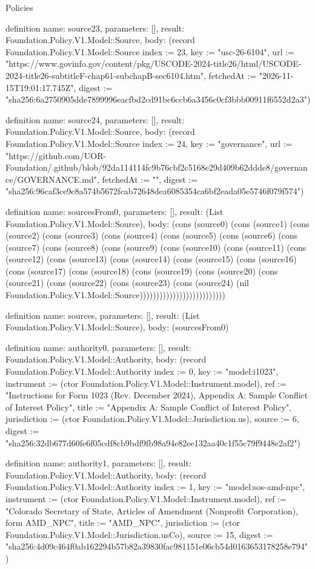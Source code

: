 \begin{lexlean}{Policies}
\begin{semanticmodule}
definition{
  name: source23,
  parameters: [],
  result: Foundation.Policy.V1.Model::Source,
  body: (record Foundation.Policy.V1.Model::Source {index := 23, key := "usc-26-6104", url := "https://www.govinfo.gov/content/pkg/USCODE-2024-title26/html/USCODE-2024-title26-subtitleF-chap61-subchapB-sec6104.htm", fetchedAt := "2026-11-15T19:01:17.745Z", digest := "sha256:6a2750905dde7899996eacfbd2cd91bc6ccb6a3456c0cf3bbb00911f6552d2a3"})
}

definition{
  name: source24,
  parameters: [],
  result: Foundation.Policy.V1.Model::Source,
  body: (record Foundation.Policy.V1.Model::Source {index := 24, key := "governance", url := "https://github.com/UOR-Foundation/.github/blob/92da114114fc9b76cbf2c5168e29d409b62ddde8/governance/GOVERNANCE.md", fetchedAt := "", digest := "sha256:96caf3ce9c8a574b5672fcab72648dea6085354ca6bf2eada05e5746f079f574"})
}

definition{
  name: sourcesFrom0,
  parameters: [],
  result: (List Foundation.Policy.V1.Model::Source),
  body: (cons (source0) (cons (source1) (cons (source2) (cons (source3) (cons (source4) (cons (source5) (cons (source6) (cons (source7) (cons (source8) (cons (source9) (cons (source10) (cons (source11) (cons (source12) (cons (source13) (cons (source14) (cons (source15) (cons (source16) (cons (source17) (cons (source18) (cons (source19) (cons (source20) (cons (source21) (cons (source22) (cons (source23) (cons (source24) (nil Foundation.Policy.V1.Model::Source))))))))))))))))))))))))))
}

definition{
  name: sources,
  parameters: [],
  result: (List Foundation.Policy.V1.Model::Source),
  body: (sourcesFrom0)
}

definition{
  name: authority0,
  parameters: [],
  result: Foundation.Policy.V1.Model::Authority,
  body: (record Foundation.Policy.V1.Model::Authority {index := 0, key := "model:i1023", instrument := (ctor Foundation.Policy.V1.Model::Instrument.model), ref := "Instructions for Form 1023 (Rev. December 2024), Appendix A: Sample Conflict of Interest Policy", title := "Appendix A: Sample Conflict of Interest Policy", jurisdiction := (ctor Foundation.Policy.V1.Model::Jurisdiction.us), source := 6, digest := "sha256:32db677d60fe6f05cdf8cb9bdf9fb98a94e82ee132aa40c1f55c79f9448e2af2"})
}

definition{
  name: authority1,
  parameters: [],
  result: Foundation.Policy.V1.Model::Authority,
  body: (record Foundation.Policy.V1.Model::Authority {index := 1, key := "model:sos-amd-npc", instrument := (ctor Foundation.Policy.V1.Model::Instrument.model), ref := "Colorado Secretary of State, Articles of Amendment (Nonprofit Corporation), form AMD_NPC", title := "AMD_NPC", jurisdiction := (ctor Foundation.Policy.V1.Model::Jurisdiction.usCo), source := 15, digest := "sha256:4d09c464f0ab162294b57b82a39830fac981151e06cb54d0163653178258e794"})
}


\end{semanticmodule}
\end{lexlean}
